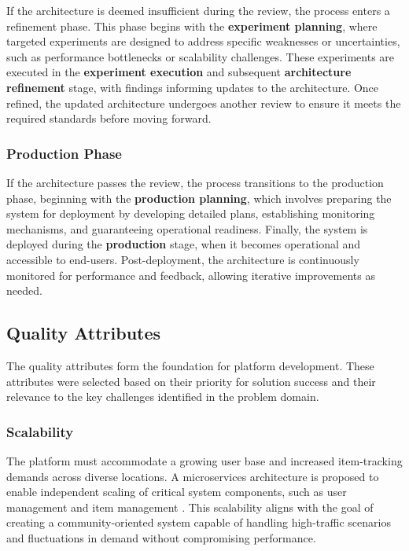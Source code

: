 If the architecture is deemed insufficient during the review, the process enters a refinement phase. This phase begins with the \textbf{experiment planning}, where targeted experiments are designed to address specific weaknesses or uncertainties, such as performance bottlenecks or scalability challenges. These experiments are executed in the \textbf{experiment execution} and subsequent \textbf{architecture refinement} stage, with findings informing updates to the architecture. Once refined, the updated architecture undergoes another review to ensure it meets the required standards before moving forward.

\subsubsection{Production Phase}

If the architecture passes the review, the process transitions to the production phase, beginning with the \textbf{production planning}, which involves preparing the system for deployment by developing detailed plans, establishing monitoring mechanisms, and guaranteeing operational readiness. Finally, the system is deployed during the \textbf{production} stage, when it becomes operational and accessible to end-users. Post-deployment, the architecture is continuously monitored for performance and feedback, allowing iterative improvements as needed.


\subsection{Quality Attributes} \label{section:quality_attributes}

The quality attributes form the foundation for platform development. These attributes were selected based on their priority for solution success and their relevance to the key challenges identified in the problem domain.

\subsubsection{Scalability}

The platform must accommodate a growing user base and increased item-tracking demands across diverse locations. A microservices architecture is proposed to enable independent scaling of critical system components, such as user management and item management \cite{Al-Debagy2021}. This scalability aligns with the goal of creating a community-oriented system capable of handling high-traffic scenarios and fluctuations in demand without compromising performance.

